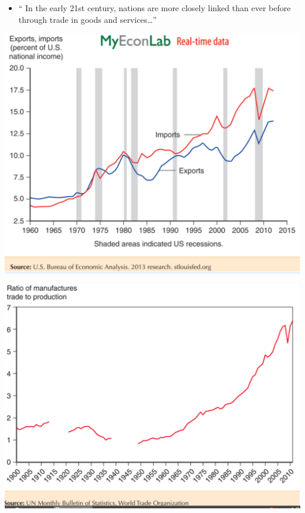 \documentclass[ignorenonframetext,]{beamer}
\begin{document}
\begin{frame}

    \begin{itemize}
        \itemsep1pt\parskip0pt
        \item `` In the early 21st century, nations are more closely linked than ever before through trade in goods and services\dots''
    \end{itemize}
   
    \includegraphics[scale=0.25]{figure1-1.png}

\end{frame}
    
\begin{frame}

    \includegraphics[scale=0.25]{Text_fig_2_5.png}

\end{frame}
\end{document}
